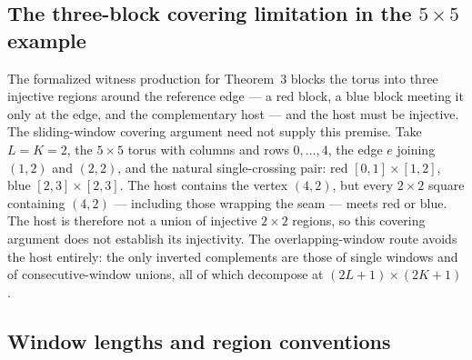 \documentclass{article}
\begin{document}
\subsection{The three-block covering limitation in the $5\times5$ example}

The formalized witness production for Theorem~3 blocks the torus into
three injective regions around the reference edge --- a red block, a
blue block meeting it only at the edge, and the complementary host ---
and the host must be injective. The sliding-window covering argument
need not supply this premise. Take $L = K = 2$, the $5\times5$ torus with columns and rows
$0,\dots,4$, the edge $e$ joining $(1,2)$ and $(2,2)$, and the natural
single-crossing pair: red $[0,1]\times[1,2]$, blue $[2,3]\times[2,3]$.
The host contains the vertex $(4,2)$, but every $2\times2$ square
containing $(4,2)$ --- including those wrapping the seam --- meets red
or blue. The host is therefore not a union of injective $2\times2$
regions, so this covering argument does not establish its injectivity. The
overlapping-window route avoids the host entirely: the only inverted
complements are those of single windows and of consecutive-window
unions, all of which decompose at $(2L+1)\times(2K+1)$.

\subsection{Window lengths and region conventions}
\end{document}
